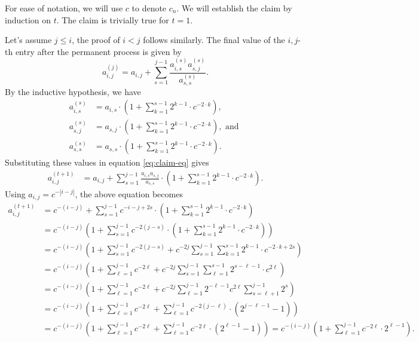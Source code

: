 \documentclass[11pt]{article}
\makeatletter
\theoremstyle{definition}
\newenvironment{proof}[1][\protect\proofname]{\par
	\normalfont\topsep6\p@\@plus6\p@\relax
	\trivlist
	\itemindent\parindent        %
	\item[\hskip\labelsep\scshape #1]\ignorespaces
}{%
	\endtrivlist\@endpefalse
}
\providecommand{\proofname}{Proof}
\makeatother
\begin{document}
\begin{proof}[Proof of Claim \ref{claim:exp-matrix}]
For ease of notation, we will use $c$ to denote $c_n$. We will establish the claim by induction on $t$. The claim is trivially true for $t=1$. 
    
    Let's assume $j \leq i$, the proof of $i < j$ follows similarly. The final value of the $i,j$-th entry after the permanent process is given by
    \begin{equation}
        a_{i,j}^{(j)} = a_{i,j} + \sum_{s=1}^{j-1}\frac{a_{i,s}^{(s)} a_{s,j}^{(s)}}{a_{s,s}^{(s)}}. \label{eq:claim-eq}
    \end{equation}
    By the inductive hypothesis, we have
    \begin{align*}
        a_{i,s}^{(s)} &= a_{i,s} \cdot\left(1 + \sum_{k=1}^{s-1} 2^{k-1}\cdot c^{-2\cdot k}  \right), \\
        a_{s,j}^{(s)} &= a_{s,j} \cdot\left(1 + \sum_{k=1}^{s-1} 2^{k-1}\cdot c^{-2\cdot k}  \right), \text{ and } \\
        a_{s,s}^{(s)} &= a_{s,s} \cdot\left(1 + \sum_{k=1}^{s-1} 2^{k-1}\cdot c^{-2\cdot k}  \right).
    \end{align*}
    Substituting these values in equation \eqref{eq:claim-eq} gives
    \begin{align*}
        a_{i,j}^{(t+1)} &= a_{i,j} + \sum_{s=1}^{j-1}\frac{a_{i,s} a_{s,j}}{a_{s,s}} \cdot  \left(1 + \sum_{k=1}^{s-1} 2^{k-1}\cdot c^{-2\cdot k}  \right).
    \end{align*}
    Using $a_{i,j} = c^{-|i-j|}$, the above equation becomes
    \begin{align*}
        a_{i,j}^{(t+1)} &= c^{-(i-j)} + \sum_{s=1}^{j-1} c^{-i-j+2s}\cdot  \left(1 + \sum_{k=1}^{s-1} 2^{k-1}\cdot c^{-2\cdot k}  \right)\\
        &= c^{-(i-j)} \left(1 + \sum_{s=1}^{j-1} c^{-2(j-s)}\cdot  \left(1 + \sum_{k=1}^{s-1} 2^{k-1}\cdot c^{-2\cdot k}  \right)\right) \\
        &= c^{-(i-j)} \left(1 + \sum_{s=1}^{j-1} c^{-2(j-s)}  +  c^{-2j}\sum_{s=1}^{j-1} \sum_{k=1}^{s-1} 2^{k-1}\cdot c^{-2\cdot k + 2s}  \right) \\
        &= c^{-(i-j)} \left(1 + \sum_{\ell=1}^{j-1} c^{-2\ell}  +  c^{-2j}\sum_{s=1}^{j-1} \sum_{\ell=1}^{s-1} 2^{s-\ell-1}\cdot c^{2\ell}  \right) \\
        &= c^{-(i-j)} \left(1 + \sum_{\ell=1}^{j-1} c^{-2\ell}  +  c^{-2j} \sum_{\ell=1}^{j-1} 2^{-\ell-1}c^{2\ell}  \sum_{s=\ell+1}^{j-1}  2^{s} \right) \\
        &= c^{-(i-j)} \left(1 + \sum_{\ell=1}^{j-1} c^{-2\ell}  + \sum_{\ell=1}^{j-1} c^{-2(j-\ell)} \cdot (2^{j-\ell-1}-1)  \right) \\
        &= c^{-(i-j)} \left(1 + \sum_{\ell=1}^{j-1} c^{-2\ell}  + \sum_{\ell=1}^{j-1} c^{-2\ell} \cdot (2^{\ell-1}-1)  \right) = c^{-(i-j)} \left(1 + \sum_{\ell=1}^{j-1} c^{-2\ell} \cdot 2^{\ell-1}  \right).
    \end{align*}
    
\end{proof}
\end{document}
